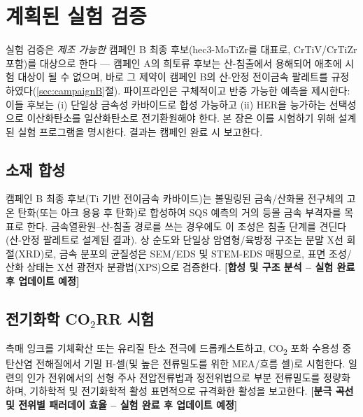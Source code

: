 \documentclass[11pt,a4paper]{report}
\newcommand{\tbu}[1]{\textcolor{red!70!black}{\textbf{[#1 -- 실험 완료 후 업데이트 예정]}}}
\begin{document}
\chapter{계획된 실험 검증}
\label{ch:experiment}

\noindent 실험 검증은 \emph{제조 가능한} 캠페인 B 최종 후보(hec3-MoTiZr를 대표로, CrTiV/CrTiZr 포함)를
대상으로 한다 --- 캠페인 A의 희토류 후보는 산-침출에서 용해되어 애초에 시험 대상이 될 수 없으며, 바로
그 제약이 캠페인 B의 산-안정 전이금속 팔레트를 규정하였다(\ref{sec:campaignB}절). 파이프라인은 구체적이고
반증 가능한 예측을 제시한다: 이들 후보는 (i) 단일상 금속성 카바이드로 합성 가능하고 (ii) HER을 능가하는
선택성으로 이산화탄소를 일산화탄소로 전기환원해야 한다. 본 장은 이를 시험하기 위해 설계된 실험 프로그램을
명시한다. 결과는 캠페인 완료 시 보고한다.

\section{소재 합성}
캠페인 B 최종 후보(Ti 기반 전이금속 카바이드)는 볼밀링된 금속/산화물 전구체의 고온 탄화(또는 아크
용융 후 탄화)로 합성하여 SQS 예측의 거의 등몰 금속 부격자를 목표로 한다. 금속열환원--산-침출 경로를
쓰는 경우에도 이 조성은 침출 단계를 견딘다(산-안정 팔레트로 설계된 결과). 상 순도와 단일상 암염형/육방정 구조는
분말 X선 회절(XRD)로, 금속 분포의 균질성은 SEM/EDS 및 STEM-EDS 매핑으로, 표면 조성/산화 상태는
X선 광전자 분광법(XPS)으로 검증한다. \tbu{합성 및 구조 분석}

\section{전기화학 CO\texorpdfstring{$_2$}{2}RR 시험}
촉매 잉크를 기체확산 또는 유리질 탄소 전극에 드롭캐스트하고, CO\textsubscript{2} 포화 수용성
중탄산염 전해질에서 기밀 H-셀(및 높은 전류밀도를 위한 MEA/흐름 셀)로 시험한다. 일련의 인가
전위에서의 선형 주사 전압전류법과 정전위법으로 부분 전류밀도를 정량화하며, 기하학적 및 전기화학적
활성 표면적으로 규격화한 활성을 보고한다. \tbu{분극 곡선 및 전위별 패러데이 효율}
\end{document}
